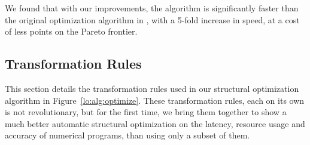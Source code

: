 We found that with our improvements, the algorithm is significantly faster than
the original optimization algorithm in \soap, with a 5-fold increase in speed,
at a cost of less points on the Pareto frontier.


\subsection{Transformation Rules}
\label{lo:sub:transformation_rules}

This section details the transformation rules used in our structural
optimization algorithm in Figure~\ref{lo:alg:optimize}.  These transformation
rules, each on its own is not revolutionary, but for the first time, we bring
them together to show a much better automatic structural optimization on the
latency, resource usage and accuracy of numerical programs, than using only a
subset of them.

